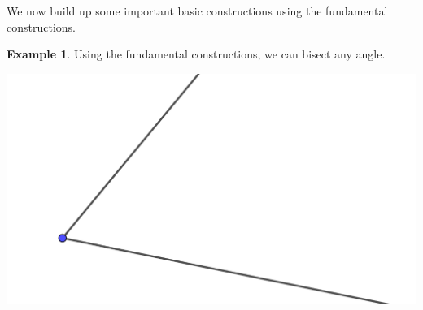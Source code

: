\documentclass[11pt]{article}
\theoremstyle{definition}
\newtheorem{example}[theorem]{Example}
\begin{document}
We now build up some important basic constructions using the fundamental constructions.

\begin{example}
  Using the fundamental constructions, we can bisect any angle. 
  \begin{center}
    \includegraphics[scale=.75]{Images/bisect_angle_1.png}
  \end{center}


\end{example}
\end{document}
